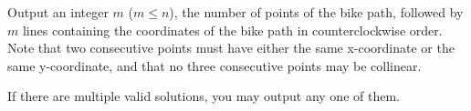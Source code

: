 
  Output an integer $m$ ($m\leq n$), the number of points of the bike path,
  followed by $m$ lines containing the coordinates of the bike path in counterclockwise order.
  Note that two consecutive points must have either the same x-coordinate or the same y-coordinate, and that no three consecutive points may be collinear.

  If there are multiple valid solutions, you may output any one of them.
